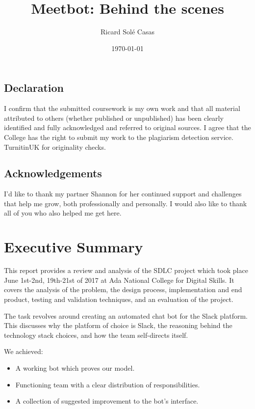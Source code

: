 \documentclass[english,a4paper,]{report}
\title{Meetbot: Behind the scenes}
\author{Ricard Solé Casas}
\institute{Google UK \and Ada National College for Digital Skills}
\date{\today}
\providecommand{\tightlist}{%
  \setlength{\itemsep}{0pt}\setlength{\parskip}{0pt}}
\begin{document}
\maketitle

\vspace*{\fill}

\section*{Declaration}

I confirm that the submitted coursework is my own work and that all
material attributed to others (whether published or unpublished) has
been clearly identified and fully acknowledged and referred to original
sources. I agree that the College has the right to submit my work to the
plagiarism detection service. TurnitinUK for originality checks.

\section*{Acknowledgements}

I'd like to thank my partner Shannon for her continued support and
challenges that help me grow, both professionally and personally. I
would also like to thank all of you who also helped me get here.

\vspace*{\fill}

{
\setcounter{tocdepth}{2}
\tableofcontents
}
\chapter{Executive Summary}\label{executive-summary}

This report provides a review and analysis of the SDLC project which
took place June 1st-2nd, 19th-21st of 2017 at Ada National College for
Digital Skills. It covers the analysis of the problem, the design
process, implementation and end product, testing and validation
techniques, and an evaluation of the project.

The task revolves around creating an automated chat bot for the Slack
platform. This discusses why the platform of choice is Slack, the
reasoning behind the technology stack choices, and how the team
self-directs itself.

We achieved:

\begin{itemize}
\tightlist
\item
  A working bot which proves our model.
\item
  Functioning team with a clear distribution of responsibilities.
\item
  A collection of suggested improvement to the bot's interface.
\end{itemize}
\end{document}
